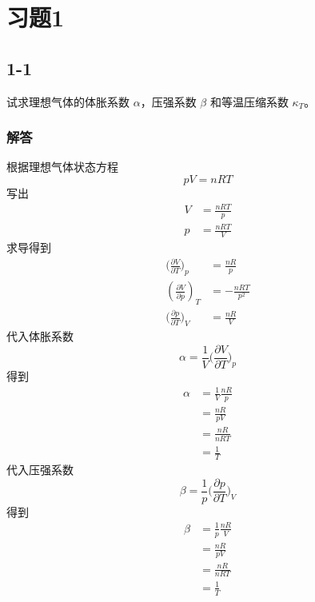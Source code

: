 \section{习题1}


\newpage
\subsection{1-1}
试求理想气体的体胀系数 $\alpha$，压强系数 $\beta$ 和等温压缩系数 $\kappa_T$。

\subsubsection{解答}
根据理想气体状态方程
\begin{equation}
    pV=nRT
\end{equation}
写出
\begin{equation}
    \begin{aligned}
        V&=\frac{nRT}{p}
\\
p&=\frac{nRT}{V}
    \end{aligned}
\end{equation}
求导得到
\begin{equation}
    \begin{aligned}
        \biggl( \frac{\partial V}{\partial T} \biggr) _p&=\frac{nR}{p}
\\
\left( \frac{\partial V}{\partial p} \right) _T&=-\frac{nRT}{p^2}
\\
\biggl( \frac{\partial p}{\partial T} \biggr) _V&=\frac{nR}{V}
    \end{aligned}
\end{equation}
代入体胀系数
\begin{equation}
    \alpha =\frac{1}{V}\biggl( \frac{\partial V}{\partial T} \biggr) _p
\end{equation}
得到
\begin{equation}
    \begin{aligned}
        \alpha &=\frac{1}{V}\frac{nR}{p}
\\
&=\frac{nR}{pV}
\\
&=\frac{nR}{nRT}
\\
&=\frac{1}{T}
    \end{aligned}
\end{equation}
代入压强系数
\begin{equation}
    \beta =\frac{1}{p}\biggl( \frac{\partial p}{\partial T} \biggr) _V
\end{equation}
得到
\begin{equation}
    \begin{aligned}
        \beta &=\frac{1}{p}\frac{nR}{V}
\\
&=\frac{nR}{pV}
\\
&=\frac{nR}{nRT}
\\
&=\frac{1}{T}
    \end{aligned}
\end{equation}
